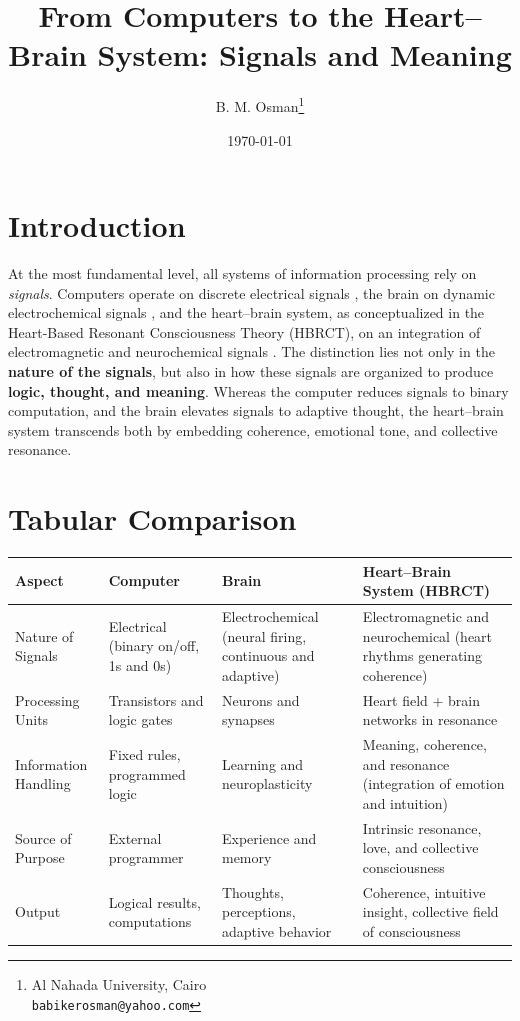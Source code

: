 \documentclass[12pt]{article}
\title{\textcolor{titleColor}{\textbf{\Huge From Computers to the Heart--Brain System: Signals and Meaning}}}
\author{B. M. Osman\thanks{Al Nahada University, Cairo \\ \texttt{babikerosman@yahoo.com}}}
\date{\today}
\begin{document}
\maketitle

\section*{Introduction}
At the most fundamental level, all systems of information processing rely on \textit{signals}.
Computers operate on discrete electrical signals \cite{vonNeumann1945, turing1937},
the brain on dynamic electrochemical signals \cite{kandel2000principles, dayan2001theoretical},
and the heart--brain system, as conceptualized in the Heart-Based Resonant Consciousness Theory (HBRCT),
on an integration of electromagnetic and neurochemical signals \cite{mcCraty2003heart, bradley2009electrophysiology}.
The distinction lies not only in the \textbf{nature of the signals}, but also in how these signals are organized to produce \textbf{logic, thought, and meaning}.
Whereas the computer reduces signals to binary computation, and the brain elevates signals to adaptive thought,
the heart--brain system transcends both by embedding coherence, emotional tone, and collective resonance.
\section*{Tabular Comparison}

\begin{tabular}{>{\raggedright\arraybackslash}p{3cm} 
                >{\raggedright\arraybackslash}p{4cm} 
                >{\raggedright\arraybackslash}p{4cm} 
                >{\raggedright\arraybackslash}p{4cm}}
\toprule
\textbf{Aspect} & \textbf{Computer} & \textbf{Brain} & \textbf{Heart--Brain System (HBRCT)} \\
\midrule
Nature of Signals 
& Electrical (binary on/off, 1s and 0s) 
& Electrochemical (neural firing, continuous and adaptive) 
& Electromagnetic and neurochemical (heart rhythms generating coherence) \\
\midrule
Processing Units 
& Transistors and logic gates 
& Neurons and synapses 
& Heart field + brain networks in resonance \\
\midrule
Information Handling 
& Fixed rules, programmed logic 
& Learning and neuroplasticity 
& Meaning, coherence, and resonance (integration of emotion and intuition) \\
\midrule
Source of Purpose 
& External programmer 
& Experience and memory 
& Intrinsic resonance, love, and collective consciousness \\
\midrule
Output 
& Logical results, computations 
& Thoughts, perceptions, adaptive behavior 
& Coherence, intuitive insight, collective field of consciousness \\
\bottomrule
\end{tabular}
\end{document}
